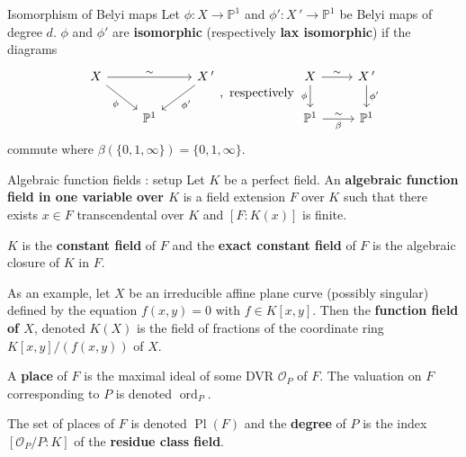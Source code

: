 \documentclass[xcolor=dvipsnames]{beamer}
\theoremstyle{plain}
\newcommand{\PP}{\mathbb P}
\DeclareMathOperator{\ord}{ord}
\DeclareMathOperator{\Pl}{Pl}
\begin{document}
  \begin{frame}[fragile]{Isomorphism of Belyi maps}
    Let $\phi\colon X\to\PP^1$
    and
    $\phi'\colon X\,'\to\PP^1$
    be Belyi maps of degree $d$.
    \newline
    $\phi$ and $\phi'$ are
    \textbf{isomorphic}
    (respectively \textbf{lax isomorphic})
    if the diagrams
    \[
      \begin{tikzcd}
        X\arrow{rr}{\sim}\arrow{dr}[swap]{\phi}
        &
        &X\,'\arrow{dl}{\phi'}\\
        &\PP^1
      \end{tikzcd},
      \text{ respectively }
      \begin{tikzcd}
        X\arrow{r}{\sim}\arrow{d}[swap]{\phi}&X\,'\arrow{d}{\phi'}\\
        \PP^1\arrow{r}{\sim}[swap]{\beta}&\PP^1
      \end{tikzcd}
    \]
    commute
    where $\beta(\{0,1,\infty\}) = \{0,1,\infty\}$.
  \end{frame}
  \begin{frame}{Algebraic function fields : setup}
    Let $K$ be a perfect field.
    An \textbf{algebraic function field in one variable over $K$}
    is a field extension $F$ over $K$ such that there exists
    $x\in F$ transcendental over $K$ and
    $[F:K(x)]$ is finite.
    \par
    $K$ is the \textbf{constant field} of $F$
    and the \textbf{exact constant field} of $F$
    is the algebraic closure of $K$ in $F$.
    \par
    As an example,
    let $X$ be an irreducible affine plane curve
    (possibly singular)
    defined by the equation $f(x,y)=0$
    with $f\in K[x,y]$.
    Then the
    \textbf{function field of $X$},
    denoted $K(X)$ is the field of fractions
    of the coordinate ring $K[x,y]/(f(x,y))$
    of $X$.
    \par
    A \textbf{place} of $F$ is the maximal ideal
    of some DVR
    $\mathcal{O}_P$ of $F$.
    The valuation on $F$ corresponding to $P$ is
    denoted $\ord_P$.
    \par
    The set of places of $F$ is denoted
    $\Pl(F)$ and the \textbf{degree}
    of $P$ is the index
    $[\mathcal{O}_P/P:K]$ of the
    \textbf{residue class field}.
  \end{frame}
\end{document}
